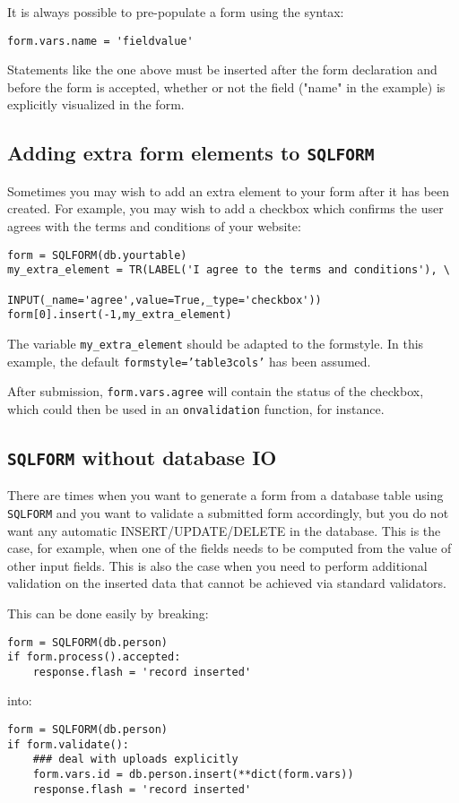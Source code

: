 \documentclass[justified,sixbynine,notoc]{tufte-book}
\def\ft{\small\tt}
\begin{document}
\begin{fullwidth}
It is always possible to pre-populate a form using the syntax:
\begin{lstlisting}
form.vars.name = 'fieldvalue'
\end{lstlisting}

Statements like the one above must be inserted after the form declaration and before the form is accepted, whether or not the field ("name" in the example) is explicitly visualized in the form.

\goodbreak\subsection{Adding extra form elements to {\ft SQLFORM}}

Sometimes you may wish to add an extra element to your form after it has been created. For example, you may wish to add a checkbox which confirms the user agrees with the terms and conditions of your website:
\begin{lstlisting}
form = SQLFORM(db.yourtable)
my_extra_element = TR(LABEL('I agree to the terms and conditions'), \
                      INPUT(_name='agree',value=True,_type='checkbox'))
form[0].insert(-1,my_extra_element)
\end{lstlisting}

The variable {\ft my\_extra\_element} should be adapted to the formstyle. In this example, the default {\ft formstyle='table3cols'} has been assumed.

After submission, {\ft form.vars.agree} will contain the status of the checkbox, which could then be used in an {\ft onvalidation} function, for instance.

\goodbreak\subsection{{\ft SQLFORM} without database IO}

There are times when you want to generate a form from a database table using {\ft SQLFORM} and you want to validate a submitted form accordingly, but you do not want any automatic INSERT/UPDATE/DELETE in the database. This is the case, for example, when one of the fields needs to be computed from the value of other input fields. This is also the case when you need to perform additional validation on the inserted data that cannot be achieved via standard validators.

This can be done easily by breaking:
\begin{lstlisting}
form = SQLFORM(db.person)
if form.process().accepted:
    response.flash = 'record inserted'
\end{lstlisting}
\noindent into:
\begin{lstlisting}
form = SQLFORM(db.person)
if form.validate():
    ### deal with uploads explicitly
    form.vars.id = db.person.insert(**dict(form.vars))
    response.flash = 'record inserted'
\end{lstlisting}


\end{fullwidth}
\end{document}
